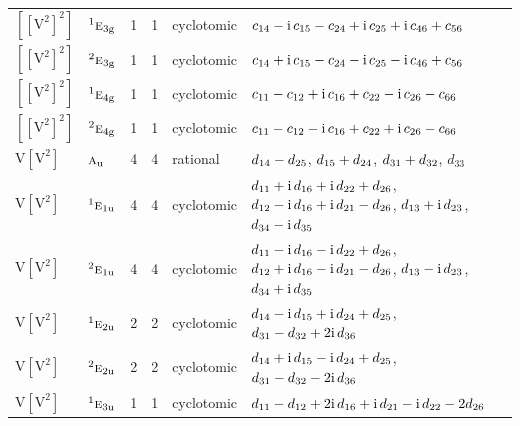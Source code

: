 \documentclass[10pt,a4paper]{article}
\numberwithin{equation}{section}
\newcommand{\irr}[1]{\text{\normalfont\scshape #1}}
\newcommand{\conjpair}[1]{{}^{#1}}
\newcommand{\ptag}[1]{\mathrm{#1}}
\newcommand{\iunit}{\mathrm{i}}
\newcommand{\jahn}[1]{\mathrm{#1}}
\newlength{\fillwidth}\newlength{\cellwidth}\newlength{\colwidth}
\newcommand{\signbreak}{\penalty100\relax}
\begin{document}
{\begin{longtable}{@{}llrrl>{\RaggedRight\arraybackslash}p{\fillwidth}@{}}
$\jahn{[[V^{2}]^{2}]}$ & $\conjpair{1}\irr{e}_{3\ptag{g}}$ & 1 & 1 & cyclotomic & $c_{14} -\signbreak \iunit{}\,c_{15} -\signbreak c_{24} +\signbreak \iunit{}\,c_{25} +\signbreak \iunit{}\,c_{46} +\signbreak c_{56}$\\
$\jahn{[[V^{2}]^{2}]}$ & $\conjpair{2}\irr{e}_{3\ptag{g}}$ & 1 & 1 & cyclotomic & $c_{14} +\signbreak \iunit{}\,c_{15} -\signbreak c_{24} -\signbreak \iunit{}\,c_{25} -\signbreak \iunit{}\,c_{46} +\signbreak c_{56}$\\
$\jahn{[[V^{2}]^{2}]}$ & $\conjpair{1}\irr{e}_{4\ptag{g}}$ & 1 & 1 & cyclotomic & $c_{11} -\signbreak c_{12} +\signbreak \iunit{}\,c_{16} +\signbreak c_{22} -\signbreak \iunit{}\,c_{26} -\signbreak c_{66}$\\
$\jahn{[[V^{2}]^{2}]}$ & $\conjpair{2}\irr{e}_{4\ptag{g}}$ & 1 & 1 & cyclotomic & $c_{11} -\signbreak c_{12} -\signbreak \iunit{}\,c_{16} +\signbreak c_{22} +\signbreak \iunit{}\,c_{26} -\signbreak c_{66}$\\
$\jahn{V[V^{2}]}$ & $\irr{a}_{\ptag{u}}$ & 4 & 4 & rational & $d_{14} -\signbreak d_{25}$, $d_{15} +\signbreak d_{24}$, $d_{31} +\signbreak d_{32}$, $d_{33}$\\
$\jahn{V[V^{2}]}$ & $\conjpair{1}\irr{e}_{1\ptag{u}}$ & 4 & 4 & cyclotomic & $d_{11} +\signbreak \iunit{}\,d_{16} +\signbreak \iunit{}\,d_{22} +\signbreak d_{26}$, $d_{12} -\signbreak \iunit{}\,d_{16} +\signbreak \iunit{}\,d_{21} -\signbreak d_{26}$, $d_{13} +\signbreak \iunit{}\,d_{23}$, $d_{34} -\signbreak \iunit{}\,d_{35}$\\
$\jahn{V[V^{2}]}$ & $\conjpair{2}\irr{e}_{1\ptag{u}}$ & 4 & 4 & cyclotomic & $d_{11} -\signbreak \iunit{}\,d_{16} -\signbreak \iunit{}\,d_{22} +\signbreak d_{26}$, $d_{12} +\signbreak \iunit{}\,d_{16} -\signbreak \iunit{}\,d_{21} -\signbreak d_{26}$, $d_{13} -\signbreak \iunit{}\,d_{23}$, $d_{34} +\signbreak \iunit{}\,d_{35}$\\
$\jahn{V[V^{2}]}$ & $\conjpair{1}\irr{e}_{2\ptag{u}}$ & 2 & 2 & cyclotomic & $d_{14} -\signbreak \iunit{}\,d_{15} +\signbreak \iunit{}\,d_{24} +\signbreak d_{25}$, $d_{31} -\signbreak d_{32} +\signbreak 2\iunit{}\,d_{36}$\\
$\jahn{V[V^{2}]}$ & $\conjpair{2}\irr{e}_{2\ptag{u}}$ & 2 & 2 & cyclotomic & $d_{14} +\signbreak \iunit{}\,d_{15} -\signbreak \iunit{}\,d_{24} +\signbreak d_{25}$, $d_{31} -\signbreak d_{32} -\signbreak 2\iunit{}\,d_{36}$\\
$\jahn{V[V^{2}]}$ & $\conjpair{1}\irr{e}_{3\ptag{u}}$ & 1 & 1 & cyclotomic & $d_{11} -\signbreak d_{12} +\signbreak 2\iunit{}\,d_{16} +\signbreak \iunit{}\,d_{21} -\signbreak \iunit{}\,d_{22} -\signbreak 2d_{26}$\\

\end{longtable}}
\end{document}
